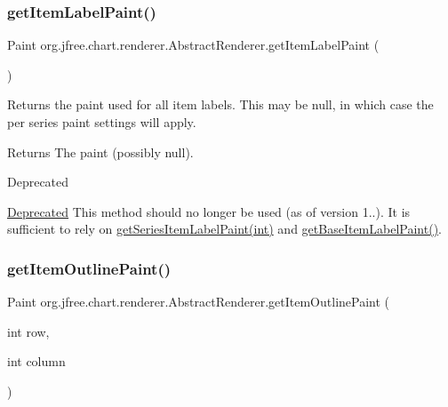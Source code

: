 \subsubsection{\texorpdfstring{get\+Item\+Label\+Paint()}{getItemLabelPaint()}\hspace{0.1cm}{\footnotesize\ttfamily [2/2]}}
{\footnotesize\ttfamily Paint org.\+jfree.\+chart.\+renderer.\+Abstract\+Renderer.\+get\+Item\+Label\+Paint (\begin{DoxyParamCaption}{ }\end{DoxyParamCaption})}

Returns the paint used for all item labels. This may be {\ttfamily null}, in which case the per series paint settings will apply.

\begin{DoxyReturn}{Returns}
The paint (possibly {\ttfamily null}).
\end{DoxyReturn}
\begin{DoxyRefDesc}{Deprecated}
\item[\mbox{\hyperlink{deprecated__deprecated000134}{Deprecated}}]This method should no longer be used (as of version 1..). It is sufficient to rely on \mbox{\hyperlink{classorg_1_1jfree_1_1chart_1_1renderer_1_1_abstract_renderer_a529914230c394fd2600e3aa35d529b63}{get\+Series\+Item\+Label\+Paint(int)}} and \mbox{\hyperlink{classorg_1_1jfree_1_1chart_1_1renderer_1_1_abstract_renderer_a553eba1baf9f5d241c06a77c80a223d6}{get\+Base\+Item\+Label\+Paint()}}. \end{DoxyRefDesc}
\mbox{\label{classorg_1_1jfree_1_1chart_1_1renderer_1_1_abstract_renderer_a854b3a3d312b4cf996de5a5494044f5a}} 
\subsubsection{\texorpdfstring{get\+Item\+Outline\+Paint()}{getItemOutlinePaint()}}
{\footnotesize\ttfamily Paint org.\+jfree.\+chart.\+renderer.\+Abstract\+Renderer.\+get\+Item\+Outline\+Paint (\begin{DoxyParamCaption}\item[{int}]{row,  }\item[{int}]{column }\end{DoxyParamCaption})}

